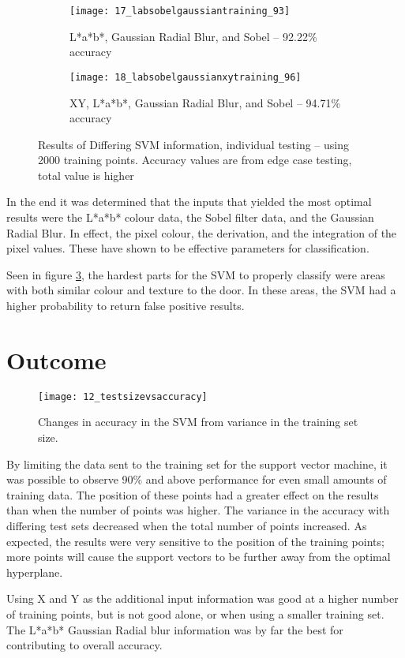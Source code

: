 \begin{figure}
\begin{subfigure}[b]{0.3\textwidth}
                \texttt{[image: 17\_labsobelgaussiantraining\_93]}
                \caption{L*a*b*, Gaussian Radial Blur, and Sobel -- 92.22\% accuracy}
                \label{fig:17_labsobelgaussiantraining_93}
        \end{subfigure}
        \begin{subfigure}[b]{0.3\textwidth}
                \centering

                \texttt{[image: 18\_labsobelgaussianxytraining\_96]}
                \caption{XY, L*a*b*, Gaussian Radial Blur, and Sobel -- 94.71\% accuracy}
                \label{fig:18_labsobelgaussianxytraining_96}
        \end{subfigure}

        \caption{Results of Differing SVM information, individual testing -- using 2000 training points. Accuracy values are from edge case testing, total value is higher}\label{fig:labResults}
\end{figure}
In the end it was determined that the inputs that yielded the most optimal results were the L*a*b* colour data, the Sobel filter data, and the Gaussian Radial Blur. In effect, the pixel colour, the derivation, and the integration of the pixel values. These have shown to be effective parameters for classification.

Seen in figure \ref{fig:labResults}, the hardest parts for the SVM to properly classify were areas with both similar colour and texture to the door. In these areas, the SVM had a higher probability to return false positive results.





\section{Outcome}

\begin{figure}[ht]
    \centering
    \texttt{[image: 12\_testsizevsaccuracy]}
    \caption{Changes in accuracy in the SVM from variance in the training set size.}
    \label{fig:12_testsizevsaccuracy}
\end{figure}

By limiting the data sent to the training set for the support vector machine, it was possible to observe 90\% and above performance for even small amounts of training data. The position of these points had a greater effect on the results than when the number of points was higher. The variance in the accuracy with differing test sets decreased when the total number of points increased. As expected, the results were very sensitive to the position of the training points; more points will cause the support vectors to be further away from the optimal hyperplane.

Using X and Y as the additional input information was good at a higher number of training points, but is not good alone, or when using a smaller training set. The L*a*b* Gaussian Radial blur information was by far the best for contributing to overall accuracy.

